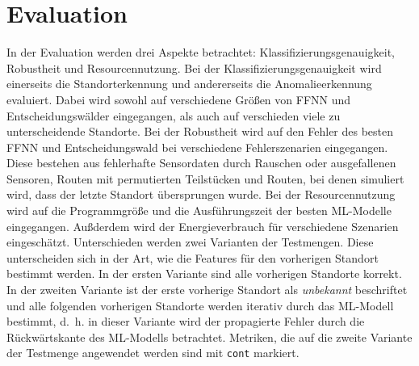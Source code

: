 \chapter{Evaluation}
In der Evaluation werden drei Aspekte betrachtet: Klassifizierungsgenauigkeit, Robustheit und Resourcennutzung.
Bei der Klassifizierungsgenauigkeit wird einerseits die Standorterkennung und andererseits die Anomalieerkennung evaluiert.
Dabei wird sowohl auf verschiedene Größen von FFNN und Entscheidungswälder eingegangen,
als auch auf verschieden viele zu unterscheidende Standorte.
\newline
\newline
Bei der Robustheit wird auf den Fehler des besten FFNN und Entscheidungswald bei verschiedene Fehlerszenarien eingegangen.
Diese bestehen aus fehlerhafte Sensordaten durch Rauschen oder ausgefallenen Sensoren,
Routen mit permutierten Teilstücken und Routen, bei denen simuliert wird, dass der letzte Standort übersprungen wurde.
\newline
\newline
Bei der Resourcennutzung wird auf die Programmgröße und die Ausführungszeit der besten ML-Modelle eingegangen.
Außderdem wird der Energieverbrauch für verschiedene Szenarien eingeschätzt.
\newline
\newline
Unterschieden werden zwei Varianten der Testmengen.
Diese unterscheiden sich in der Art, wie die Features für den vorherigen Standort bestimmt werden.
In der ersten Variante sind alle vorherigen Standorte korrekt.
In der zweiten Variante ist der erste vorherige Standort als \textit{unbekannt} beschriftet und alle folgenden vorherigen Standorte werden iterativ durch das ML-Modell bestimmt,
d.~h. in dieser Variante wird der propagierte Fehler durch die Rückwärtskante des ML-Modells betrachtet.
Metriken, die auf die zweite Variante der Testmenge angewendet werden sind mit \texttt{cont} markiert.










